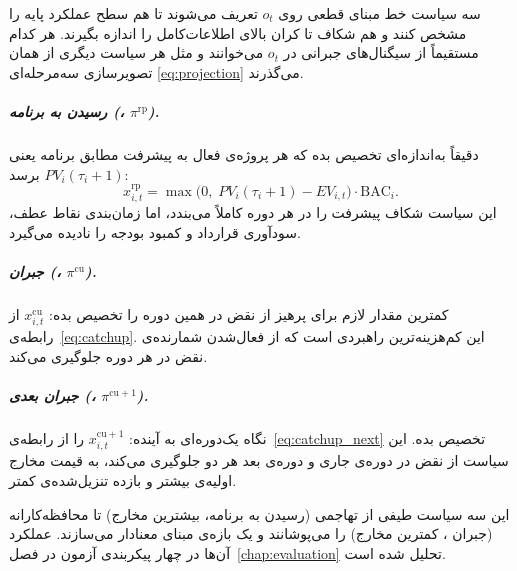 سه سیاست خط مبنای قطعی روی $o_t$ تعریف می‌شوند تا هم سطح عملکرد
پایه را مشخص کنند و هم شکاف تا کران بالای اطلاعات‌کامل را اندازه
بگیرند. هر کدام مستقیماً از سیگنال‌های جبرانی در $o_t$ می‌خوانند و
مثل هر سیاست دیگری از همان تصویرسازی سه‌مرحله‌ای
\eqref{eq:projection} می‌گذرند.

\subparagraph{رسیدن به برنامه (، $\pi^{\mathrm{rp}}$).}
دقیقاً به‌اندازه‌ای تخصیص بده که هر پروژه‌ی فعال به پیشرفت مطابق برنامه
یعنی $PV_i(\tau_i + 1)$ برسد:
\begin{equation}
  x^{\mathrm{rp}}_{i,t}
    = \max\!\bigl(0,\; PV_i(\tau_i+1) - EV_{i,t}\bigr) \cdot
      \mathrm{BAC}_i.
  \label{eq:reach_plan}
\end{equation}
این سیاست شکاف پیشرفت را در هر دوره کاملاً می‌بندد، اما زمان‌بندی نقاط
عطف، سودآوری قرارداد و کمبود بودجه را نادیده می‌گیرد.

\subparagraph{جبران  (، $\pi^{\mathrm{cu}}$).}
کمترین مقدار لازم برای پرهیز از نقض در همین دوره را تخصیص بده:
$x^{\mathrm{cu}}_{i,t}$ از رابطه‌ی~\eqref{eq:catchup}. این کم‌هزینه‌ترین
راهبردی است که از فعال‌شدن شمارنده‌ی نقض در هر دوره جلوگیری می‌کند.

\subparagraph{جبران  بعدی (، $\pi^{\mathrm{cu}+1}$).}
نگاه یک‌دوره‌ای به آینده: $x^{\mathrm{cu}+1}_{i,t}$ را از
رابطه‌ی~\eqref{eq:catchup_next} تخصیص بده. این سیاست از نقض در دوره‌ی
جاری و دوره‌ی بعد هر دو جلوگیری می‌کند، به قیمت مخارج اولیه‌ی بیشتر و
بازده تنزیل‌شده‌ی کمتر.

این سه سیاست طیفی از تهاجمی (رسیدن به برنامه، بیشترین مخارج) تا
محافظه‌کارانه (جبران ، کمترین مخارج) را می‌پوشانند و یک بازه‌ی
مبنای معنادار می‌سازند. عملکرد آن‌ها در چهار پیکربندی آزمون در
فصل~\ref{chap:evaluation} تحلیل شده است.